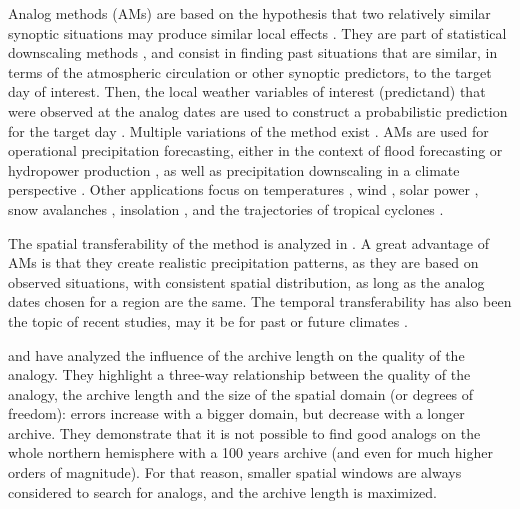 \documentclass[hess, manuscript]{copernicus}
\begin{document}
\introduction  %
\label{sec:introduction}

Analog methods (AMs) are based on the hypothesis that two relatively similar synoptic situations may produce similar local effects \citep{Lorenz1956, Lorenz1969}. They are part of statistical downscaling methods \citep{Maraun2010}, and consist in finding past situations that are similar, in terms of the atmospheric circulation or other synoptic predictors, to the target day of interest. Then, the local weather variables of interest (predictand) that were observed at the analog dates are used to construct a probabilistic prediction for the target day \citep{Duband1970, Zorita1999}. Multiple variations of the method exist \citep[a non-exhaustive listing can be found in][]{BenDaoud2016}. AMs are used for operational precipitation forecasting, either in the context of flood forecasting or hydropower production \citep[e.g.,][]{Guilbaud1997, Bontron2005, Hamill2006, Desaint2008a, GarciaHernandez2009b, Bliefernicht2010, Marty2010, Marty2012, Horton2012, Obled2014, Hamill2015, BenDaoud2016}, as well as precipitation downscaling in a climate perspective \citep[e.g.,][]{Radanovics2013, Chardon2014, Dayon2015}. Other applications focus on temperatures \citep{Radinovic1975, Woodcock1980, Kruizinga1983, DelleMonache2013, Caillouet2016}, wind \citep{Gordon1987, DelleMonache2013, DelleMonache2011, Vanvyve2015, Alessandrini2015, Junk2015, Junk2015c}, solar power \citep{Alessandrini2015a, Bessa2015}, snow avalanches \citep{Obled1980, Bolognesi1993}, insolation \citep{Bois1981}, and the trajectories of tropical cyclones \citep{Keenan1981, Sievers2000, Fraedrich2003}.

The spatial transferability of the method is analyzed in \citet{Chardon2014}. A great advantage of AMs is that they create realistic precipitation patterns, as they are based on observed situations, with consistent spatial distribution, as long as the analog dates chosen for a region are the same. The temporal transferability has also been the topic of recent studies, may it be for past or future climates \citep{Dayon2015, Caillouet2016}.

\citet{Ruosteenoja1988} and \citet{Vandendool1994} have analyzed the influence of the archive length on the quality of the analogy. They highlight a three-way relationship between the quality of the analogy, the archive length and the size of the spatial domain (or degrees of freedom): errors increase with a bigger domain, but decrease with a longer archive. They demonstrate that it is not possible to find good analogs on the whole northern hemisphere with a 100 years archive (and even for much higher orders of magnitude). For that reason, smaller spatial windows are always considered to search for analogs, and the archive length is maximized. 
\end{document}
